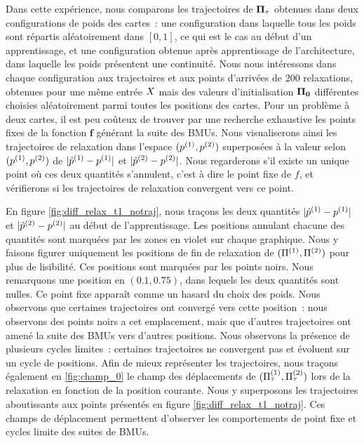 \documentclass[../main]{subfiles}
\begin{document}
Dans cette expérience, nous comparons les trajectoires de $\mathbf{\Pi}_\tau$ obtenues dans deux configurations de poids des cartes~: une configuration dans laquelle tous les poids sont répartis aléatoirement dans $[0,1]$, ce qui est le cas au début d'un apprentissage, et une configuration obtenue après apprentissage de l'architecture, dans laquelle les poids présentent une continuité.
Nous nous intéressons dans chaque configuration aux trajectoires et aux points d'arrivées de 200 relaxations, obtenues pour une même entrée $X$ mais des valeurs d'initialisation $\mathbf{\Pi_0}$ différentes choisies aléatoirement parmi toutes les positions des cartes.
Pour un problème à deux cartes, il est peu coûteux de trouver par une recherche exhaustive les points fixes de la fonction $\mathbf{f}$ générant la suite des BMUs.
Nous visualiserons ainsi les trajectoires de relaxation dans l'espace $(p^{({1})},p^{({2})})$ superposées à la valeur selon  $(p^{({1})},p^{({2})})$ de $\lvert \hat{p}^{({1})} - p^{({1})} \rvert$ et $\lvert \hat{p}^{({2})} - p^{({2})}\rvert$. 
Nous regarderons s'il existe un unique point où ces deux quantités s'annulent, c'est à dire le point fixe de $f$, et vérifierons si les trajectoires de relaxation convergent vers ce point.

En figure \ref{fig:diff_relax_t1_notraj}, nous traçons les deux quantités $\lvert \hat{p}^{({1})} - p^{({1})} \rvert$ et $\lvert \hat{p}^{({2})} - p^{({2})}\rvert$ au début de l'apprentissage. Les positions annulant chacune des quantités sont marquées par les zones en violet sur chaque graphique.
Nous y faisons figurer uniquement les positions de fin de relaxation de $(\Pi^{({1})},\Pi^{({2})})$ pour plus de lisibilité. Ces positions sont marquées par les points noirs.
Nous remarquons une position en $(0.1, 0.75)$, dans lequels les deux quantités sont nulles. Ce point fixe apparaît comme un hasard du choix des poids.
Nous observons que certaines trajectoires ont convergé vers cette position~: nous observons des points noirs a cet emplacement, mais que d'autres trajectoires ont amené la suite des BMUs vers d'autres positions.
Nous observons la présence de plusieurs cycles limites~: certaines trajectoires ne convergent pas et évoluent sur un cycle de positions.
Afin de mieux représenter les trajectoires, nous traçons également en \ref{fig:champ_0} le champ des déplacements de $(\Pi^{({1})}_\tau,\Pi^{({2})}_\tau)$ lors de la relaxation en fonction de la position courante. 
Nous y superposons les trajectoires aboutissants aux points présentés en figure \ref{fig:diff_relax_t1_notraj}.
Ces champs de déplacement permettent d'observer les comportements de point fixe et cycles limite des suites de BMUs.
\end{document}
